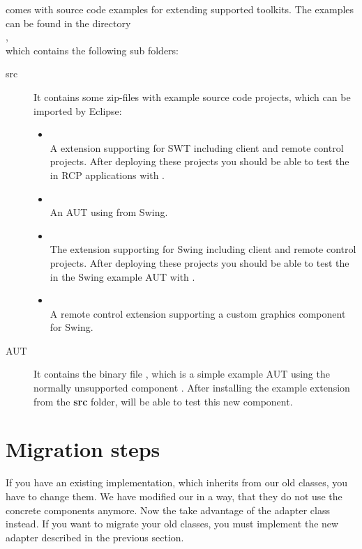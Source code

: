 \app{} comes with source code examples for extending supported toolkits. The
examples can be found in the directory\\
,\\
which contains the following sub folders:

\begin{description}
 \item[src] It contains some zip-files with example source code projects, which
            can be imported by Eclipse:
 \begin{itemize}
   \item {}\\
         A \app{} extension supporting  for SWT including client
         and remote control projects. After deploying these projects you should
         be able to test the  in RCP applications with \app{}.
   \item {}\\
         An AUT using  from Swing.
   \item {}\\
         The \app{} extension supporting  for Swing including
         client and remote control projects. After deploying these projects you
         should be able to test the  in the Swing example AUT
         with \app{}.
   \item {}\\
         A \app{} remote control extension supporting a custom graphics
         component for Swing.
 \end{itemize}
 \item[AUT] It contains the binary file , which is a simple
 example AUT using the normally unsupported component . After
 installing the  example extension from the \textbf{src}
 folder, \app{} will be able to test this new component.
\end{description}

\section{Migration steps}
If you have an existing implementation, which inherits from our old classes,
you have to change them. We have modified our \gdtesterclasses in a way, that they
do not use the concrete components anymore. Now the \gdtesterclasses take
advantage of the adapter class instead. If you want to migrate your old
classes, you must implement the new adapter described in the previous section.
